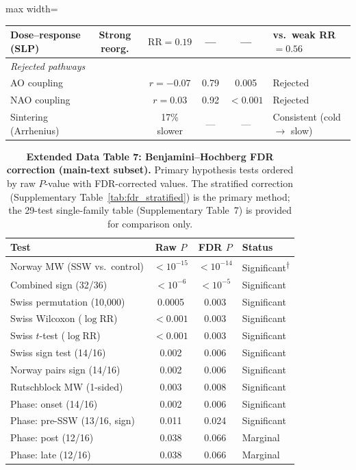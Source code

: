 \documentclass[11pt,letterpaper]{article}
\begin{document}
\begin{table}[!ht]
\begin{adjustbox}{max width=\textwidth}
\begin{tabular}{lccccl}
Dose--response (SLP) & Strong reorg. & $\mathrm{RR} = 0.19$ & --- & --- & vs.\ weak RR $= 0.56$ \\
\midrule
\multicolumn{6}{l}{\textit{Rejected pathways}} \\
AO coupling & & $r = -0.07$ & 0.79 & 0.005 & Rejected \\
NAO coupling & & $r = 0.03$ & 0.92 & $< 0.001$ & Rejected \\
Sintering (Arrhenius) & & 17\% slower & --- & --- & Consistent (cold $\to$ slow) \\
\bottomrule
\end{tabular}
\end{adjustbox}
\end{table}

\begin{table}[!ht]
\centering
\caption{\textbf{Extended Data Table 7: Benjamini--Hochberg FDR correction (main-text subset).}
Primary hypothesis tests ordered by raw $P$-value with FDR-corrected values. The stratified correction (Supplementary Table~\ref{tab:fdr_stratified}) is the primary method; the 29-test single-family table (Supplementary Table~7) is provided for comparison only.}
\label{tab:fdr}
\small
\begin{tabular}{lccl}
\toprule
Test & Raw $P$ & FDR $P$ & Status \\
\midrule
Norway MW (SSW vs.\ control) & $< 10^{-15}$ & $< 10^{-14}$ & Significant\textsuperscript{$\dagger$} \\
Combined sign (32/36) & $< 10^{-6}$ & $< 10^{-5}$ & Significant \\
Swiss permutation (10,000) & 0.0005 & 0.003 & Significant \\
Swiss Wilcoxon ($\log$RR) & $< 0.001$ & 0.003 & Significant \\
Swiss $t$-test ($\log$RR) & $< 0.001$ & 0.003 & Significant \\
Swiss sign test (14/16) & 0.002 & 0.006 & Significant \\
Norway pairs sign (14/16) & 0.002 & 0.006 & Significant \\
Rutschblock MW (1-sided) & 0.003 & 0.008 & Significant \\
Phase: onset (14/16) & 0.002 & 0.006 & Significant \\
Phase: pre-SSW (13/16, sign) & 0.011 & 0.024 & Significant \\
Phase: post (12/16) & 0.038 & 0.066 & Marginal \\
Phase: late (12/16) & 0.038 & 0.066 & Marginal \\

\end{tabular}
\end{table}
\end{document}
